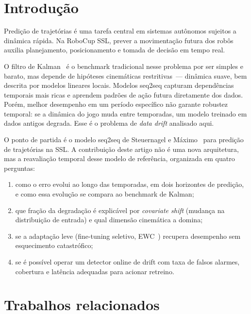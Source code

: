 \documentclass[runningheads]{llncs}
\begin{document}
\section{Introdu\c{c}\~ao}

Predi\c{c}\~ao de trajet\'orias \'e uma tarefa central em sistemas aut\^onomos sujeitos a din\^amica r\'apida. Na RoboCup SSL, prever a movimenta\c{c}\~ao futura dos rob\^os auxilia planejamento, posicionamento e tomada de decis\~ao em tempo real.

O filtro de Kalman~\cite{kalman} \'e o benchmark tradicional nesse problema por ser simples e barato, mas depende de hip\'oteses cinem\'aticas restritivas~--- din\^amica suave, bem descrita por modelos lineares locais. Modelos seq2seq capturam depend\^encias temporais mais ricas e aprendem padr\~oes de a\c{c}\~ao futura diretamente dos dados. Por\'em, melhor desempenho em um per\'iodo espec\'ifico n\~ao garante robustez temporal: se a din\^amica do jogo muda entre temporadas, um modelo treinado em dados antigos degrada. Esse \'e o problema de \textit{data drift} analisado aqui.

O ponto de partida \'e o modelo seq2seq de Steuernagel e M\'aximo~\cite{seq2seq} para predi\c{c}\~ao de trajet\'orias na SSL. A contribui\c{c}\~ao deste artigo n\~ao \'e uma nova arquitetura, mas a reavalia\c{c}\~ao temporal desse modelo de refer\^encia, organizada em quatro perguntas:

\begin{enumerate}
    \item como o erro evolui ao longo das temporadas, em dois horizontes de predi\c{c}\~ao, e como essa evolu\c{c}\~ao se compara ao benchmark de Kalman;
    \item que fra\c{c}\~ao da degrada\c{c}\~ao \'e explic\'avel por \textit{covariate shift} (mudan\c{c}a na distribui\c{c}\~ao de entrada) e qual dimens\~ao cinem\'atica a domina;
    \item se a adapta\c{c}\~ao leve (fine-tuning seletivo, EWC~\cite{kirkpatrick2017}) recupera desempenho sem esquecimento catastr\'ofico;
    \item se \'e poss\'ivel operar um detector online de drift com taxa de falsos alarmes, cobertura e lat\^encia adequadas para acionar retreino.
\end{enumerate}

\section{Trabalhos relacionados}
\end{document}
